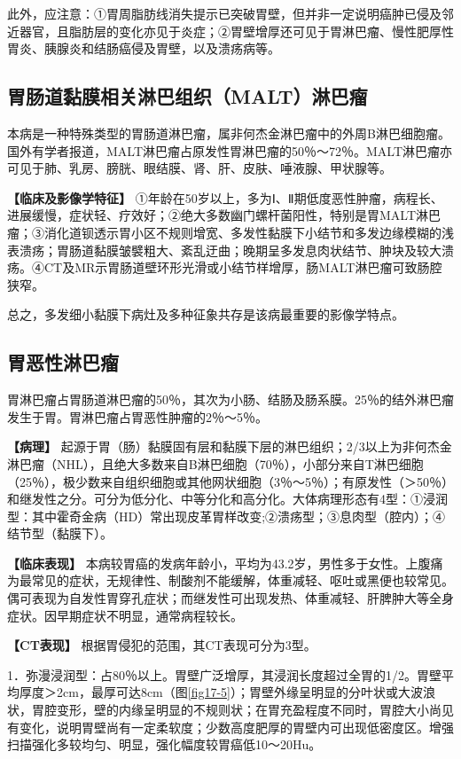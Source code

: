 此外，应注意：①胃周脂肪线消失提示已突破胃壁，但并非一定说明癌肿已侵及邻近器官，且脂肪层的变化亦见于炎症；②胃壁增厚还可见于胃淋巴瘤、慢性肥厚性胃炎、胰腺炎和结肠癌侵及胃壁，以及溃疡病等。

\subsection{胃肠道黏膜相关淋巴组织（MALT）淋巴瘤}

本病是一种特殊类型的胃肠道淋巴瘤，属非何杰金淋巴瘤中的外周B淋巴细胞瘤。国外有学者报道，MALT淋巴瘤占原发性胃淋巴瘤的50％～72％。MALT淋巴瘤亦可见于肺、乳房、膀胱、眼结膜、肾、肝、皮肤、唾液腺、甲状腺等。

\textbf{【临床及影像学特征】}
①年龄在50岁以上，多为Ⅰ、Ⅱ期低度恶性肿瘤，病程长、进展缓慢，症状轻、疗效好；②绝大多数幽门螺杆菌阳性，特别是胃MALT淋巴瘤；③消化道钡透示胃小区不规则增宽、多发性黏膜下小结节和多发边缘模糊的浅表溃疡；胃肠道黏膜皱襞粗大、紊乱迂曲；晚期呈多发息肉状结节、肿块及较大溃疡。④CT及MR示胃肠道壁环形光滑或小结节样增厚，肠MALT淋巴瘤可致肠腔狭窄。

总之，多发细小黏膜下病灶及多种征象共存是该病最重要的影像学特点。

\subsection{胃恶性淋巴瘤}

胃淋巴瘤占胃肠道淋巴瘤的50％，其次为小肠、结肠及肠系膜。25％的结外淋巴瘤发生于胃。胃淋巴瘤占胃恶性肿瘤的2％～5％。

\textbf{【病理】}
起源于胃（肠）黏膜固有层和黏膜下层的淋巴组织；2/3以上为非何杰金淋巴瘤（NHL），且绝大多数来自B淋巴细胞（70％），小部分来自T淋巴细胞（25％），极少数来自组织细胞或其他网状细胞（3％～5％）；有原发性（＞50％）和继发性之分。可分为低分化、中等分化和高分化。大体病理形态有4型：①浸润型：其中霍奇金病（HD）常出现皮革胃样改变;②溃疡型；③息肉型（腔内）；④结节型（黏膜下）。

\textbf{【临床表现】}
本病较胃癌的发病年龄小，平均为43.2岁，男性多于女性。上腹痛为最常见的症状，无规律性、制酸剂不能缓解，体重减轻、呕吐或黑便也较常见。偶可表现为自发性胃穿孔症状；而继发性可出现发热、体重减轻、肝脾肿大等全身症状。因早期症状不明显，通常病程较长。

\textbf{【CT表现】} 根据胃侵犯的范围，其CT表现可分为3型。

1．弥漫浸润型：占80％以上。胃壁广泛增厚，其浸润长度超过全胃的1/2。胃壁平均厚度＞2cm，最厚可达8cm（图\ref{fig17-5}）；胃壁外缘呈明显的分叶状或大波浪状，胃腔变形，壁的内缘呈明显的不规则状；在胃充盈程度不同时，胃腔大小尚见有变化，说明胃壁尚有一定柔软度；少数高度肥厚的胃壁内可出现低密度区。增强扫描强化多较均匀、明显，强化幅度较胃癌低10～20Hu。

